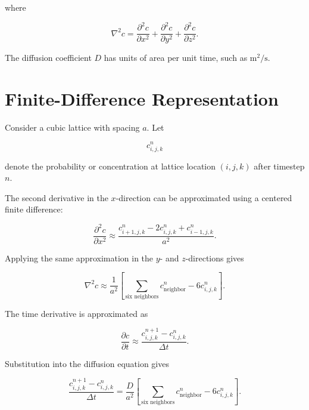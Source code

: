 \documentclass[11pt]{article}
\begin{document}
where

\begin{equation}
    \nabla^2c
    =
    \frac{\partial^2c}{\partial x^2}
    +
    \frac{\partial^2c}{\partial y^2}
    +
    \frac{\partial^2c}{\partial z^2}.
\end{equation}

The diffusion coefficient \(D\) has units of area per unit time, such as
\(\si{\meter\squared\per\second}\).

\section{Finite-Difference Representation}

Consider a cubic lattice with spacing \(a\). Let

\begin{equation}
    c_{i,j,k}^{n}
\end{equation}

denote the probability or concentration at lattice location \((i,j,k)\) after timestep \(n\).

The second derivative in the \(x\)-direction can be approximated using a centered finite difference:

\begin{equation}
    \frac{\partial^2c}{\partial x^2}
    \approx
    \frac{
        c_{i+1,j,k}^{n}
        -2c_{i,j,k}^{n}
        +c_{i-1,j,k}^{n}
    }{a^2}.
\end{equation}

Applying the same approximation in the \(y\)- and \(z\)-directions gives

\begin{equation}
    \nabla^2c
    \approx
    \frac{1}{a^2}
    \left[
        \sum_{\text{six neighbors}}
        c_{\mathrm{neighbor}}^{n}
        -
        6c_{i,j,k}^{n}
    \right].
\end{equation}

The time derivative is approximated as

\begin{equation}
    \frac{\partial c}{\partial t}
    \approx
    \frac{
        c_{i,j,k}^{n+1}
        -
        c_{i,j,k}^{n}
    }{\Delta t}.
\end{equation}

Substitution into the diffusion equation gives

\begin{equation}
    \frac{
        c_{i,j,k}^{n+1}
        -
        c_{i,j,k}^{n}
    }{\Delta t}
    =
    \frac{D}{a^2}
    \left[
        \sum_{\text{six neighbors}}
        c_{\mathrm{neighbor}}^{n}
        -
        6c_{i,j,k}^{n}
    \right].
\end{equation}
\end{document}
